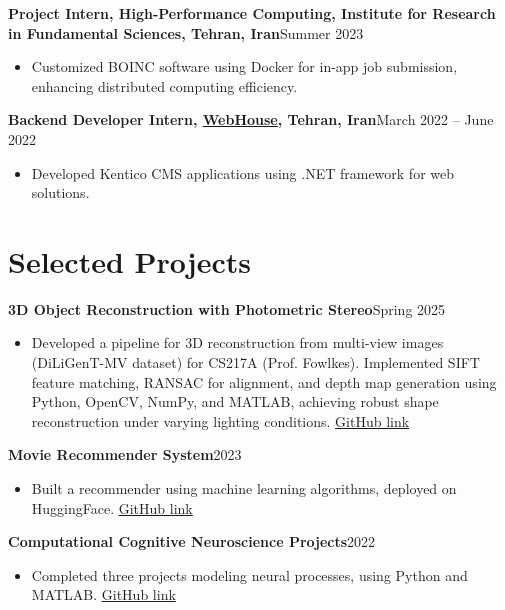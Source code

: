 \documentclass[a4paper,10pt]{article}
\begin{document}
\textbf{Project Intern, High-Performance Computing, Institute for Research in Fundamental Sciences, Tehran, Iran}\hfill Summer 2023
\vspace{-0.5em}
\begin{itemize}
  \item Customized BOINC software using Docker for in-app job submission, enhancing distributed computing efficiency.
\end{itemize}

\textbf{Backend Developer Intern, \href{https://www.linkedin.com/company/webhouse-ir/}{WebHouse}, Tehran, Iran}\hfill March 2022 -- June 2022
\vspace{-0.5em}
\begin{itemize}
  \item Developed Kentico CMS applications using .NET framework for web solutions.
\end{itemize}

\section*{Selected Projects}
\textbf{3D Object Reconstruction with Photometric Stereo}\hfill Spring 2025
\vspace{-0.5em}
\begin{itemize}
  \item Developed a pipeline for 3D reconstruction from multi-view images (DiLiGenT-MV dataset) for CS217A (Prof. Fowlkes). Implemented SIFT feature matching, RANSAC for alignment, and depth map generation using Python, OpenCV, NumPy, and MATLAB, achieving robust shape reconstruction under varying lighting conditions. \href{https://github.com/sepehr-mousaviyan/3D-Object-Reconstruction-with-Photometric-Stereo}{GitHub link}
\end{itemize}

\textbf{Movie Recommender System}\hfill 2023
\vspace{-0.5em}
\begin{itemize}
  \item Built a recommender using machine learning algorithms, deployed on HuggingFace. \href{https://github.com/sepehr-mousaviyan/Movie_Recommender}{GitHub link}
\end{itemize}

\textbf{Computational Cognitive Neuroscience Projects}\hfill 2022
\vspace{-0.5em}
\begin{itemize}
  \item Completed three projects modeling neural processes, using Python and MATLAB. \href{https://github.com/sepehr-mousaviyan/ComputationalNeuroscienceProjects}{GitHub link}
\end{itemize}
\end{document}
